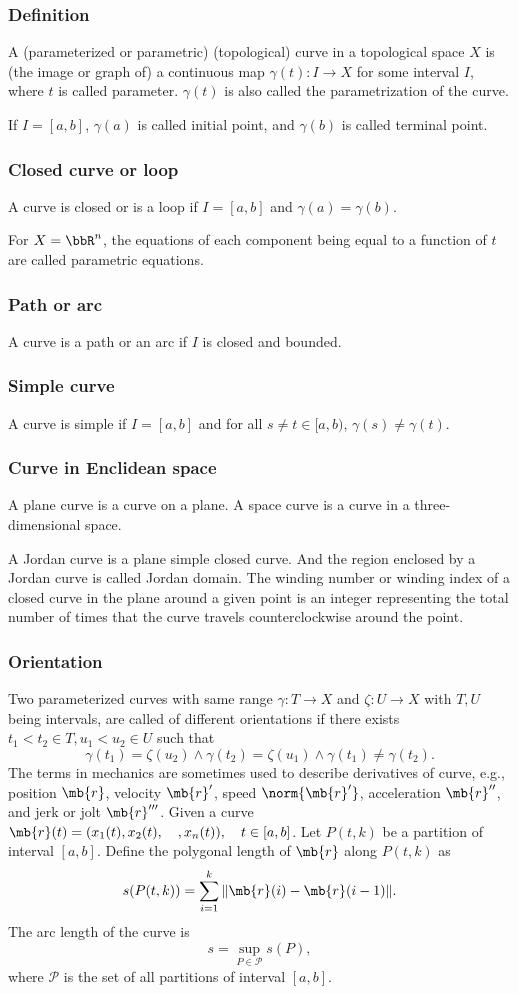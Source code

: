 \subsubsection{Definition}
A (parameterized or parametric) (topological) curve in a topological space $X$ is (the image or graph of) a continuous map $\gamma(t)\colon I\to X$ for some interval $I$, where $t$ is called parameter. $\gamma(t)$ is also called the parametrization of the curve.

If $I=[a,b]$, $\gamma(a)$ is called initial point, and $\gamma(b)$ is called terminal point.
\subsubsection{Closed curve or loop}
A curve is closed or is a loop if $I=[a,b]$ and $\gamma(a)=\gamma(b)$.

For $X=\bbR^n$, the equations of each component being equal to a function of $t$ are called parametric equations.
\subsubsection{Path or arc}
A curve is a path or an arc if $I$ is closed and bounded.
\subsubsection{Simple curve}
A curve is simple if $I=[a,b]$ and for all $s\neq t\in[a,b)$, $\gamma(s)\neq\gamma(t)$.
\subsubsection{Curve in Enclidean space}
A plane curve is a curve on a plane. A space curve is a curve in a three-dimensional space.

A Jordan curve is a plane simple closed curve. And the region enclosed by a Jordan curve is called Jordan domain.
The winding number or winding index of a closed curve in the plane around a given point is an integer representing the total number of times that the curve travels counterclockwise around the point.
\subsubsection{Orientation}
Two parameterized curves with same range $\gamma\colon T\to X$ and $\zeta\colon U\to X$ with $T,U$ being intervals, are called of different orientations if there exists $t_1<t_2\in T,u_1<u_2\in U$ such that
\[\gamma(t_1)=\zeta(u_2)\land\gamma(t_2)=\zeta(u_1)\land\gamma(t_1)\neq\gamma(t_2).\]
The terms in mechanics are sometimes used to describe derivatives of curve, e.g., position $\mb{r}$, velocity $\mb{r}'$, speed $\norm{\mb{r}'}$, acceleration $\mb{r}''$, and jerk or jolt $\mb{r}'''$.
Given a curve $\mb{r}(t)=(x_1(t),x_2(t),\quad,x_n(t)),\quad t\in[a,b]$. Let $P(t,k)$ be a partition of interval $[a,b]$. Define the polygonal length of $\mb{r}$ along $P(t,k)$ as
\[s(P(t,k))=\sum_{i=1}^k\|\mb{r}(i)-\mb{r}(i-1)\|.\]
The arc length of the curve is
\[s=\sup_{P\in\mathcal{P}}s(P),\]
where $\mathcal{P}$ is the set of all partitions of interval $[a,b]$.

